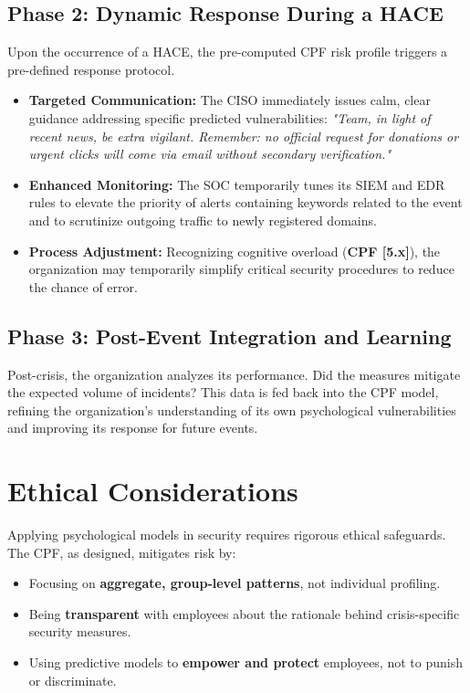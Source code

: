 \documentclass[11pt,a4paper]{article}
\begin{document}
\subsection{Phase 2: Dynamic Response During a HACE}
Upon the occurrence of a HACE, the pre-computed CPF risk profile triggers a pre-defined response protocol.
\begin{itemize}
\item \textbf{Targeted Communication:} The CISO immediately issues calm, clear guidance addressing specific predicted vulnerabilities: \textit{"Team, in light of recent news, be extra vigilant. Remember: no official request for donations or urgent clicks will come via email without secondary verification."}
\item \textbf{Enhanced Monitoring:} The SOC temporarily tunes its SIEM and EDR rules to elevate the priority of alerts containing keywords related to the event and to scrutinize outgoing traffic to newly registered domains.
\item \textbf{Process Adjustment:} Recognizing cognitive overload (\textbf{CPF [5.x]}), the organization may temporarily simplify critical security procedures to reduce the chance of error.
\end{itemize}

\subsection{Phase 3: Post-Event Integration and Learning}
Post-crisis, the organization analyzes its performance. Did the measures mitigate the expected volume of incidents? This data is fed back into the CPF model, refining the organization's understanding of its own psychological vulnerabilities and improving its response for future events.

\section{Ethical Considerations}
Applying psychological models in security requires rigorous ethical safeguards. The CPF, as designed, mitigates risk by:
\begin{itemize}
\item Focusing on \textbf{aggregate, group-level patterns}, not individual profiling.
\item Being \textbf{transparent} with employees about the rationale behind crisis-specific security measures.
\item Using predictive models to \textbf{empower and protect} employees, not to punish or discriminate.
\end{itemize}
\end{document}

